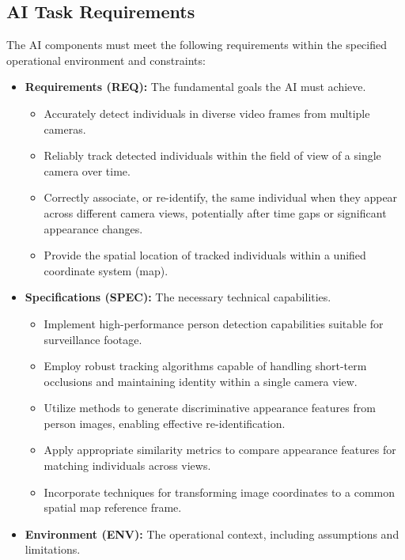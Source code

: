 \subsection{AI Task Requirements}
\label{subsection:ai_task_reqs} %
The AI components must meet the following requirements within the specified operational environment and constraints:
\begin{itemize}
    \item \textbf{Requirements (REQ):} The fundamental goals the AI must achieve.
        \begin{itemize}
            \item Accurately detect individuals in diverse video frames from multiple cameras.
            \item Reliably track detected individuals within the field of view of a single camera over time.
            \item Correctly associate, or re-identify, the same individual when they appear across different camera views, potentially after time gaps or significant appearance changes.
            \item Provide the spatial location of tracked individuals within a unified coordinate system (map).
        \end{itemize}
    \item \textbf{Specifications (SPEC):} The necessary technical capabilities.
        \begin{itemize}
            \item Implement high-performance person detection capabilities suitable for surveillance footage.
            \item Employ robust tracking algorithms capable of handling short-term occlusions and maintaining identity within a single camera view.
            \item Utilize methods to generate discriminative appearance features from person images, enabling effective re-identification.
            \item Apply appropriate similarity metrics to compare appearance features for matching individuals across views.
            \item Incorporate techniques for transforming image coordinates to a common spatial map reference frame.
        \end{itemize}
    \item \textbf{Environment (ENV):} The operational context, including assumptions and limitations.
        \begin{itemize}

\end{itemize}
\end{itemize}
